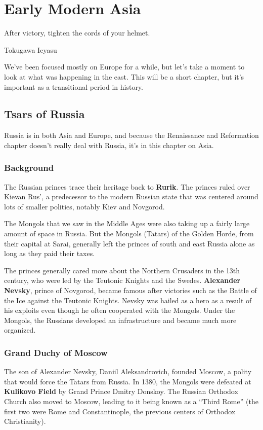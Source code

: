 \chapter{Early Modern Asia}

\epigraph{%
  After victory, tighten the cords of your helmet.
}{Tokugawa Ieyasu}

We've been focused mostly on Europe for a while,
but let's take a moment to look at what was happening in the east.
This will be a short chapter, but it's important as a transitional period in history.

\section{Tsars of Russia}

Russia is in both Asia and Europe,
and because the Renaissance and Reformation chapter doesn't really deal with Russia,
it's in this chapter on Asia.

\subsection*{Background}

The Russian princes trace their heritage back to \textbf{Rurik}.
The princes ruled over Kievan Rus',
a predecessor to the modern Russian state that was centered around lots of smaller polities,
notably Kiev and Novgorod.

The Mongols that we saw in the Middle Ages
were also taking up a fairly large amount of space in Russia.
But the Mongols (Tatars) of the Golden Horde, from their capital at Sarai,
generally left the princes of south and east Russia alone as long as they paid their taxes.

The princes generally cared more about the Northern Crusaders in the 13th century,
who were led by the Teutonic Knights and the Swedes.
\textbf{Alexander Nevsky}, prince of Novgorod,
became famous after victories such as the Battle of the Ice against the Teutonic Knights.
Nevsky was hailed as a hero as a result of his exploits
even though he often cooperated with the Mongols.
Under the Mongols, the Russians developed an infrastructure and became much more organized.

\subsection*{Grand Duchy of Moscow}

The son of Alexander Nevsky, Daniil Aleksandrovich, founded Moscow,
a polity that would force the Tatars from Russia.
In 1380, the Mongols were defeated at \textbf{Kulikovo Field} by Grand Prince Dmitry Donskoy.
The Russian Orthodox Church also moved to Moscow, leading to it being known as a ``Third Rome''
(the first two were Rome and Constantinople, the previous centers of Orthodox Christianity).

